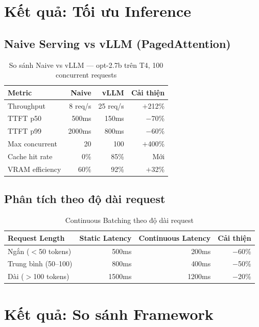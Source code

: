 \documentclass[12pt,a4paper]{report}
\begin{document}
\section{Kết quả: Tối ưu Inference}

\subsection{Naive Serving vs vLLM (PagedAttention)}

\begin{table}[h]
\centering
\caption{So sánh Naive vs vLLM --- opt-2.7b trên T4, 100 concurrent requests}
\label{tab:naive-vs-vllm}
\begin{tabular}{lrrr}
\toprule
\textbf{Metric} & \textbf{Naive} & \textbf{vLLM} & \textbf{Cải thiện} \\
\midrule
Throughput & 8 req/s & 25 req/s & $+$212\% \\
TTFT p50 & 500ms & 150ms & $-$70\% \\
TTFT p99 & 2000ms & 800ms & $-$60\% \\
Max concurrent & 20 & 100 & $+$400\% \\
Cache hit rate & 0\% & 85\% & Mới \\
VRAM efficiency & 60\% & 92\% & $+$32\% \\
\bottomrule
\end{tabular}
\end{table}

\subsection{Phân tích theo độ dài request}

\begin{table}[h]
\centering
\caption{Continuous Batching theo độ dài request}
\label{tab:batching-by-length}
\begin{tabular}{lrrr}
\toprule
\textbf{Request Length} & \textbf{Static Latency} & \textbf{Continuous Latency} & \textbf{Cải thiện} \\
\midrule
Ngắn ($<$50 tokens) & 500ms & 200ms & $-$60\% \\
Trung bình (50--100) & 800ms & 400ms & $-$50\% \\
Dài ($>$100 tokens) & 1500ms & 1200ms & $-$20\% \\
\bottomrule
\end{tabular}
\end{table}

\section{Kết quả: So sánh Framework}
\end{document}
